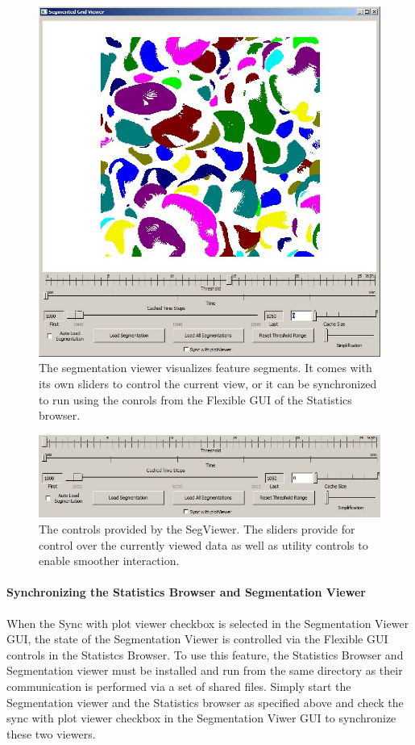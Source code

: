 \begin{figure}[h]
  \center
  \includegraphics[width=6in]{jpeg/segViewer.jpg} 
  \caption{The segmentation viewer visualizes feature segments.  It comes with its own sliders to control the current view, or it
  can be synchronized to run using the conrols from the Flexible GUI of the Statistics browser.}
  \label{fig:segViewer}
\end{figure}

\begin{figure}[h]
  \center
  \includegraphics[width=6in]{jpeg/segViewerSliders.jpg} 
  \caption{The controls provided by the SegViewer. The sliders provide for control over the currently viewed data as well as utility controls to enable smoother interaction.}
  \label{fig:segViewerControls}
\end{figure}

\paragraph{Synchronizing the Statistics Browser and Segmentation Viewer}
When the Sync with plot viewer checkbox is selected in the Segmentation Viewer GUI, the state of the Segmentation Viewer
is controlled via the Flexible GUI controls in the Statistcs Browser.   To use this feature, the Statistics Browser and Segmentation viewer must be 
installed and run from the same directory as their communication is performed via a set of shared files. Simply start the Segmentation viewer and the
Statistics browser as specified above and check the sync with plot viewer checkbox in the Segmentation Viwer GUI to synchronize these two viewers.


